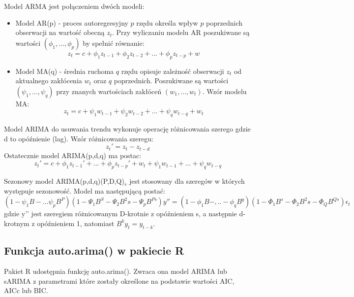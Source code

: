 \documentclass[11pt]{report}
\begin{document}
Model ARMA jest połączeniem dwóch modeli:
\begin{itemize}
\item Model AR(p) - proces autoregresyjny $p$ rzędu określa wpływ $p$ poprzednich obserwacji na wartość obecną $z_t$.
Przy wyliczaniu modelu AR poszukiwane są wartości $(\phi_1, ..., \phi_p)$ by spełnić równanie\cite{armia_s_zajac}:
\begin{equation}
    z_t = c + \phi_1 z_{t-1} + \phi_2 z_{t-2} + ... + \phi_p z_{t-p}+w
\end{equation}


\item Model MA(q) - średnia ruchoma $q$ rzędu opisuje zależność obserwacji $z_t$ od aktualnego zakłócenia $w_t$ oraz $q$ poprzednich.  Poszukiwane są wartości $(\psi_1, ..., \psi_q)$ przy znanych wartościach zakłóceń $(w_1, ..., w_t)$. Wzór modelu MA\cite{armia_s_zajac}: 
\begin{equation}
    z_t = c + \psi_1 w_{t-1} + \psi_2 w_{t-2} + ... + \psi_q w_{t-q} + w_t
\end{equation}
\end{itemize}

Model ARIMA do usuwania trendu wykonuje operację różnicowania szerego gdzie d to opóźnienie (lag). Wzór różnicowania szeregu\cite{armia_s_zajac}:
\begin{equation}
    z_{t}'=z_t-z_{t-d}
\end{equation}
Ostatecznie model ARIMA(p,d,q) ma postac\cite{armia_s_zajac}:
\begin{equation}
    z_t' = c + \phi_1 z_{t-1}' + ... + \phi_p z_{t-p}' + w_t + \psi_1 w_{t-1} + ... + \psi_q w_{t-q}
\end{equation}

Sezonowy model ARIMA(p,d,q)(P,D,Q)$_s$ jest stosowany dla szeregów w których występuje sezonowość. Model ma następującą postać:
\begin{equation}
( 1-\psi_1 B - ... \psi_p B^P )(1-\Psi_1B^S-\Psi_2 B^2s - \Psi_p B^{Ps})y'' = (1-\phi_1 B - ,.. - \phi_q B^q)(1-\Phi_1 B^s - \Phi_2 B^2s - \Phi_Q B^{Qs})\epsilon_t
\end{equation}
gdzie y’’ jest szeregiem różnicowanym D-krotnie z opóźnieniem s, a następnie d-krotnym z opóźnieniem 1, natomiast $B^ky_t=y_{t-k}$\cite{analiza_i_prognozy_szeregow_czasowych_quantup}.

\subsection{Funkcja auto.arima() w pakiecie R}
Pakiet R udostępnia funkcję auto.arima(). Zwraca ona model ARIMA lub sARIMA z parametrami które zostały określone na podstawie wartości AIC, AICc lub BIC.
\end{document}
